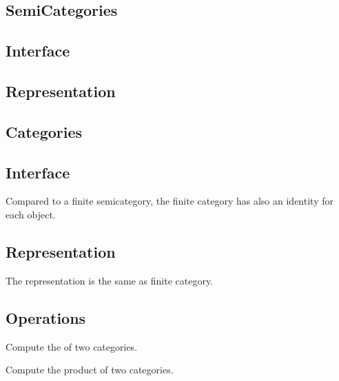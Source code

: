 
\subsection{SemiCategories}
\subsection*{Interface}

\subsection*{Representation}


\subsection{Categories}
\subsection*{Interface}
Compared to a finite semicategory, the finite category has also an identity for each object.

\subsection*{Representation}

The representation is the same as finite category.

\subsection*{Operations}

\begin{codeexercise}
    Compute the  of two categories.

\end{codeexercise}

\begin{codeexercise}
    Compute the product of two categories.

\end{codeexercise}

